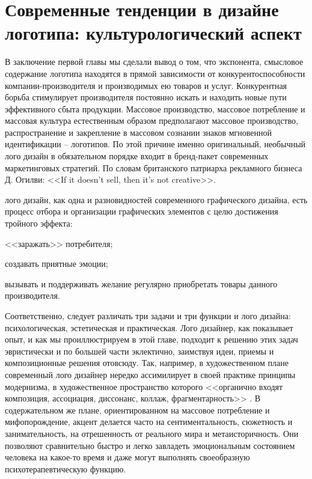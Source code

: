 \section{Современные тенденции в дизайне логотипа: культурологический аспект}

В заключение первой главы мы сделали вывод о том, что экспонента, смысловое содержание логотипа
находятся в прямой зависимости от конкурентоспособности компании-производителя  и производимых ею
товаров и услуг.  Конкурентная борьба стимулирует производителя постоянно искать и находить новые
пути эффективного сбыта продукции. Массовое производство, массовое потребление и массовая культура
естественным образом предполагают массовое производство, распространение и закрепление в массовом
сознании знаков мгновенной идентификации -- логотипов. По этой причине именно оригинальный, необычный
лого дизайн в обязательном порядке входит в бренд-пакет современных маркетинговых стратегий. По
словам британского патриарха рекламного бизнеса Д. Огилви: <<If it doesn’t sell, then
it’s not creative>>.

лого дизайн, как одна и разновидностей современного графического дизайна, есть процесс отбора и
организации графических элементов с целю достижения тройного эффекта:
\begin{enumerate*}[label=\asbuk*)]
\item <<заражать>> потребителя;
\item создавать приятные эмоции;
\item вызывать и поддерживать желание регулярно приобретать товары данного производителя.
\end{enumerate*}

Соответственно, следует различать три задачи и три функции и лого дизайна:
психологическая, эстетическая и практическая. Лого дизайнер, как показывает опыт, и как мы
проиллюстрируем в этой главе, подходит к решению этих задач эвристически и по большей части
эклектично, заимствуя идеи, приемы и композиционные решения отовсюду. Так, например, в художественном плане современный лого дизайнер нередко ассимилирует в своей практике принципы модернизма, в художественное пространство которого <<органично входят композиция, ассоциация, диссонанс, коллаж, фрагментарность>> \autocite[][322]{edoshina2002} . В содержательном же плане,
ориентированном на массовое потребление и мифопорождение, акцент делается часто на
сентиментальность, сюжетность и занимательность, на отрешенность от реального мира и
метаисторичность. \autocite{book:konradova} Они позволяют сравнительно быстро и легко завладеть эмоциональным состоянием человека на какое-то время и даже могут выполнять своеобразную психотерапевтическую функцию.

